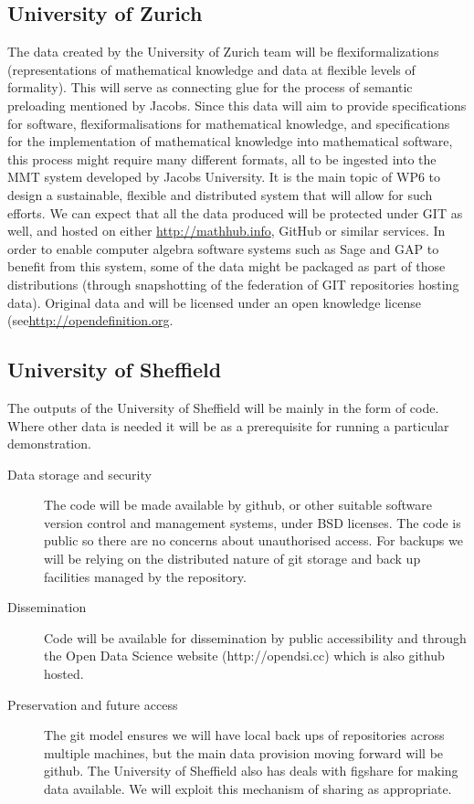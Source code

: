 \documentclass[12pt]{article}
\begin{document}
\subsection{University of Zurich}
The data created by the University of Zurich team will be flexiformalizations (representations of mathematical knowledge and data at flexible levels of formality). 
This will serve as connecting glue for the process of semantic preloading mentioned by Jacobs. 
Since this data will aim to provide specifications for software, flexiformalisations for mathematical knowledge, and specifications for the implementation of mathematical knowledge into mathematical software, this process might require many different formats, all to be ingested into the MMT system developed by Jacobs University. 
It is the main topic of WP6 to design a sustainable, flexible and distributed system that will allow for such efforts. We can expect that all the data produced will be protected under GIT as well, and hosted on either \url{http://mathhub.info}, GitHub or similar services. 
In order to enable computer algebra software systems such as Sage and GAP to benefit from this system, some of the data might be packaged as part of those distributions (through snapshotting of the federation of GIT repositories hosting data).
Original data and will be licensed under an open knowledge license (see\url{http://opendefinition.org}.

\subsection{University of Sheffield}

The outputs of the University of Sheffield will be mainly in the form of code. Where other data is needed it will be as a prerequisite for running a particular demonstration. 
\begin{description}
\item[Data storage and security] The code will be made available by github, or other suitable software version control and management systems, under BSD licenses. The code is public so there are no concerns about unauthorised access. For backups we will be relying on the distributed nature of git storage and back up facilities managed by the repository.

\item[Dissemination] Code will be available for dissemination by public accessibility and through the Open Data Science website (http://opendsi.cc) which is also github hosted.

\item[Preservation and future access] The git model ensures we will have local back ups of repositories across multiple machines, but the main data provision moving forward will be github. The University of Sheffield also has deals with figshare for making data available. We will exploit this mechanism of sharing as appropriate.
\end{description}
\end{document}
